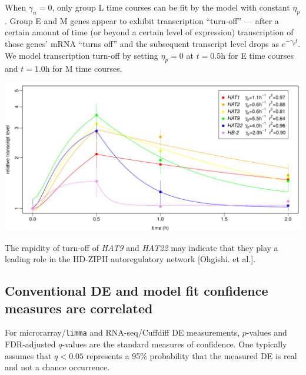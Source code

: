 \documentclass[aspb,landscape]{a0poster}
\newlength{\figwidth}
\newlength{\figtopspace}
\begin{document}
\begin{multicols}{3}
  When $\gamma_n=0$, only group L time courses can be fit by the model with constant $\eta_p$. Group E and M genes appear to exhibit transcription
  ``turn-off'' --- after a certain amount of time (or beyond a certain level of expression) transcription of those genes' mRNA ``turns off'' and the subsequent transcript level
  drops as $e^{-\gamma_p t}$. We model transcription turn-off by setting $\eta_p=0$ at $t=0.5$h for E time courses and $t=1.0$h for M time courses.

  \begin{center}\vspace{\figtopspace}
    \includegraphics[width=\figwidth]{hdzip}
  \end{center}

  The rapidity of turn-off of \textit{HAT9} and \textit{HAT22} may indicate that they play a leading role in the HD-ZIPII autoregulatory network [Ohgishi. et al.].

  \subsection*{Conventional DE and model fit confidence measures are correlated}

  For microrarray/\texttt{limma} and RNA-seq/Cuffdiff DE measurements, $p$-values and FDR-adjusted $q$-values are the standard measures of confidence.
  One typically assumes that $q<0.05$ represents a 95\% probability that the measured DE is real and not a chance occurrence.
  

\end{multicols}
\end{document}
